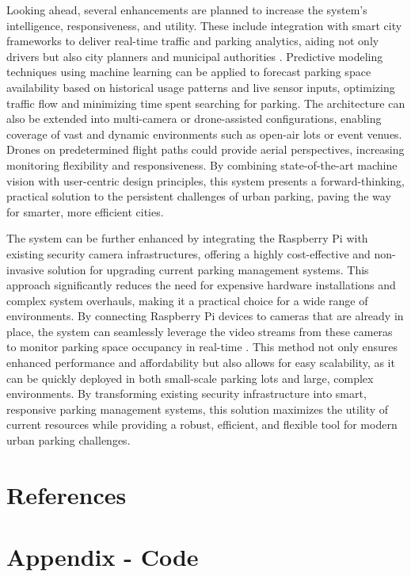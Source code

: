 \documentclass[conference]{IEEEtran}
\begin{document}
Looking ahead, 
several enhancements are planned to increase the system's intelligence, 
responsiveness, 
and utility. 
These include integration with smart city frameworks to deliver real-time traffic and parking analytics, 
aiding not only drivers but also city planners and municipal authorities \cite{smart_cities}. 
Predictive modeling techniques using machine learning can be applied to forecast parking space availability based on historical usage patterns and live sensor inputs, 
optimizing traffic flow and minimizing time spent searching for parking. 
The architecture can also be extended into multi-camera or drone-assisted configurations, 
enabling coverage of vast and dynamic environments such as open-air lots or event venues. 
Drones on predetermined flight paths could provide aerial perspectives, 
increasing monitoring flexibility and responsiveness. 
By combining state-of-the-art machine vision with user-centric design principles, 
this system presents a forward-thinking, 
practical solution to the persistent challenges of urban parking, 
paving the way for smarter, more efficient cities.

The system can be further enhanced by integrating the Raspberry Pi with existing security camera infrastructures, 
offering a highly cost-effective and non-invasive solution for upgrading current parking management systems. 
This approach significantly reduces the need for expensive hardware installations and complex system overhauls, 
making it a practical choice for a wide range of environments. 
By connecting Raspberry Pi devices to cameras that are already in place, 
the system can seamlessly leverage the video streams from these cameras to monitor parking space occupancy in real-time \cite{parking_space_management}. 
This method not only ensures enhanced performance and affordability but also allows for easy scalability, 
as it can be quickly deployed in both small-scale parking lots and large, 
complex environments. 
By transforming existing security infrastructure into smart, 
responsive parking management systems, 
this solution maximizes the utility of current resources while providing a robust, 
efficient, 
and flexible tool for modern urban parking challenges.

\section{References}

\printbibliography

\newpage

\onecolumn

\section{Appendix - Code}

\inputminted{python}{inference_export.py}
\end{document}
